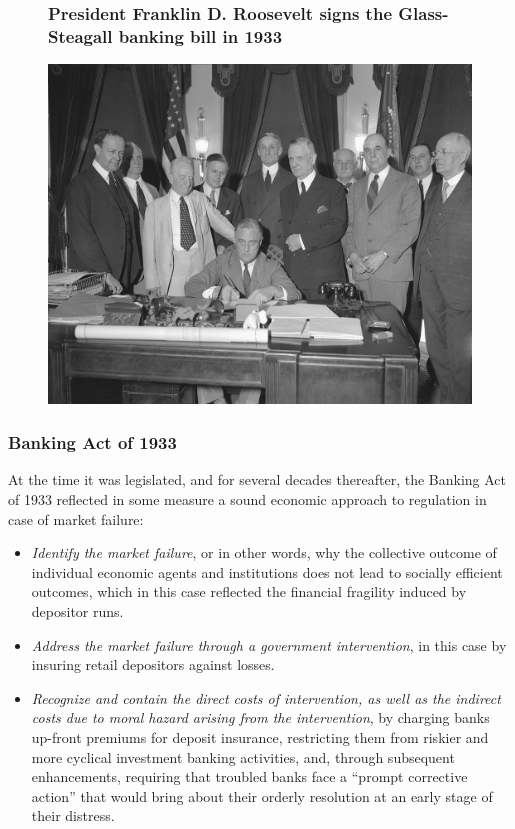 \documentclass[11pt]{beamer}
\begin{document}
\begin{frame}
\begin{figure}
\frametitle{President Franklin D. Roosevelt signs the Glass-Steagall banking bill in 1933}
\includegraphics[width=1\textwidth]{GS1.png}
\end{figure}
\end{frame}








\begin{frame}
\frametitle{Banking Act of 1933}
At the time it was legislated, and for several decades thereafter, the
Banking Act of 1933 reflected in some measure a sound economic approach
to regulation in case of market failure:
\begin{itemize}
\item \textit{Identify the market failure}, or in other words, why the collective outcome of individual economic agents and institutions does not lead to
socially efficient outcomes, which in this case reflected the financial
fragility induced by depositor runs.
\item \textit{Address the market failure through a government intervention}, in this case by insuring retail depositors against losses.
\item \textit{Recognize and contain the direct costs of intervention, as well as the indirect costs due to moral hazard arising from the intervention}, by
charging banks up-front premiums for deposit insurance, restricting
them from riskier and more cyclical investment banking activities, and,
through subsequent enhancements, requiring that troubled banks face
a “prompt corrective action” that would bring about their orderly resolution at an early stage of their distress.
\end{itemize}




\end{frame}
\end{document}
